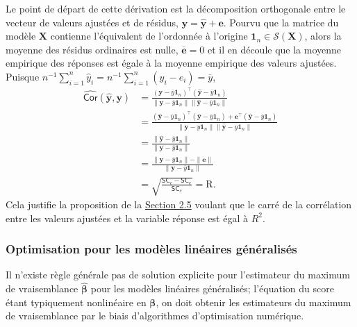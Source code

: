 \documentclass[
  11pt,
  letterpaper,
]{article}
\theoremstyle{definition}
\theoremstyle{definition}
\theoremstyle{definition}
\theoremstyle{definition}
\theoremstyle{remark}
\begin{document}
Le point de départ de cette dérivation est la décomposition orthogonale entre le vecteur de valeurs ajustées et de résidus, \(\boldsymbol{y}=\widehat{\boldsymbol{y}} + \boldsymbol{e}\). Pourvu que la matrice du modèle \(\mathbf{X}\) contienne l'équivalent de l'ordonnée à l'origine \(\mathbf{1}_n \in \mathcal{S}(\mathbf{X})\), alors la moyenne des résidus ordinaires est nulle, \(\overline{\boldsymbol{e}}=0\) et il en découle que la moyenne empirique des réponses est égale à la moyenne empirique des valeurs ajustées. Puisque \(n^{-1}\sum_{i=1}^n \widehat{y}_i = n^{-1}\sum_{i=1}^n ({y}_i-e_i)=\overline{y}\),
\begin{align*}
\widehat{\mathsf{Cor}}\left(\widehat{\boldsymbol{y}}, \boldsymbol{y}\right)
&= \frac{(\boldsymbol{y} - \overline{y}\mathbf{1}_n)^\top(\widehat{\boldsymbol{y}} - \overline{y}\mathbf{1}_n)}
{\|\boldsymbol{y} - \overline{y}\mathbf{1}_n\|\|\widehat{\boldsymbol{y}} - \overline{y}\mathbf{1}_n\|}
\\&= \frac{(\widehat{\boldsymbol{y}} - \overline{y}\mathbf{1}_n)^\top(\widehat{\boldsymbol{y}} - \overline{y}\mathbf{1}_n) +
\boldsymbol{e}^\top(\widehat{\boldsymbol{y}} - \overline{y}\mathbf{1}_n)}
{\|\boldsymbol{y} - \overline{y}\mathbf{1}_n\|\|\widehat{\boldsymbol{y}} - \overline{y}\mathbf{1}_n\|}
\\&= \frac{\|\widehat{\boldsymbol{y}} - \overline{y}\mathbf{1}_n\|}
{\|\boldsymbol{y} - \overline{y}\mathbf{1}_n\|}
\\&= \frac{\|\boldsymbol{y} - \overline{y}\mathbf{1}_n\| - \|\boldsymbol{e}\|}
{\|\boldsymbol{y} - \overline{y}\mathbf{1}_n\|}
\\&= \sqrt{\frac{\mathsf{SC}_c-\mathsf{SC}_e}{\mathsf{SC}_c}}= \mathrm{R}.
\end{align*}
Cela justifie la proposition de la \protect\hyperlink{coefR2}{Section 2.5} voulant que le carré de la corrélation entre les valeurs ajustées et la variable réponse est égal à \(R^2\).

\hypertarget{optimisation-pour-les-moduxe8les-linuxe9aires-guxe9nuxe9ralisuxe9s}{%
\subsubsection{Optimisation pour les modèles linéaires généralisés}\label{optimisation-pour-les-moduxe8les-linuxe9aires-guxe9nuxe9ralisuxe9s}}

Il n'existe règle générale pas de solution explicite pour l'estimateur du maximum de vraisemblance \(\widehat{\boldsymbol{\beta}}\) pour les modèles linéaires généralisés; l'équation du score étant typiquement nonlinéaire en \(\boldsymbol{\beta}\), on doit obtenir les estimateurs du maximum de vraisemblance par le biais d'algorithmes d'optimisation numérique.
\end{document}
